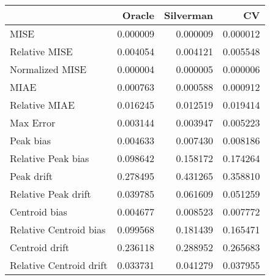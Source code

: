 \begin{tabular}{lrrr}
  \hline
 & Oracle & Silverman & CV \\ 
  \hline
MISE & 0.000009 & 0.000009 & 0.000012 \\ 
  Relative MISE & 0.004054 & 0.004121 & 0.005548 \\ 
  Normalized MISE & 0.000004 & 0.000005 & 0.000006 \\ 
  MIAE & 0.000763 & 0.000588 & 0.000912 \\ 
  Relative MIAE & 0.016245 & 0.012519 & 0.019414 \\ 
  Max Error & 0.003144 & 0.003947 & 0.005223 \\ 
  Peak bias & 0.004633 & 0.007430 & 0.008186 \\ 
  Relative Peak bias & 0.098642 & 0.158172 & 0.174264 \\ 
  Peak drift & 0.278495 & 0.431265 & 0.358810 \\ 
  Relative Peak drift & 0.039785 & 0.061609 & 0.051259 \\ 
  Centroid bias & 0.004677 & 0.008523 & 0.007772 \\ 
  Relative Centroid bias & 0.099568 & 0.181439 & 0.165471 \\ 
  Centroid drift & 0.236118 & 0.288952 & 0.265683 \\ 
  Relative Centroid drift & 0.033731 & 0.041279 & 0.037955 \\ 
   \hline
\end{tabular}
